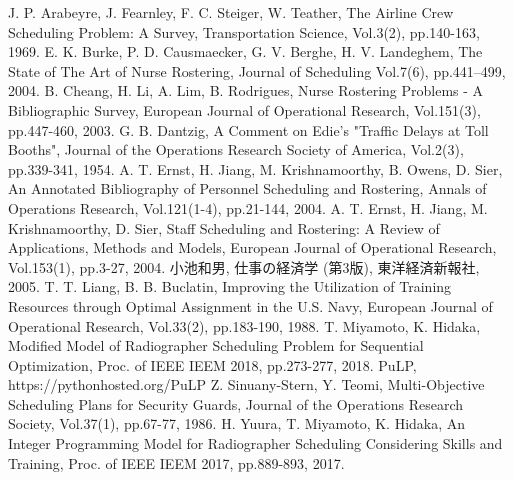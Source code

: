 \documentclass[twocolumn]{jsarticle}
\begin{document}
\begin{thebibliography}{99}
    J. P. Arabeyre, J. Fearnley, F. C. Steiger, W. Teather,
    The Airline Crew Scheduling Problem: A Survey,
    Transportation Science,
	Vol.3(2), pp.140-163, 1969.
    E. K. Burke, P. D. Causmaecker, G. V. Berghe, H. V. Landeghem,
    The State of The Art of Nurse Rostering,
    Journal of Scheduling Vol.7(6), pp.441–499, 2004.
    B. Cheang, H. Li, A. Lim, B. Rodrigues,
    Nurse Rostering Problems - A Bibliographic Survey,
    European Journal of Operational Research,
    Vol.151(3), pp.447-460, 2003.
    G. B. Dantzig, A Comment on Edie's "Traffic Delays at Toll Booths",
    Journal of the Operations Research Society of America,
    Vol.2(3), pp.339-341, 1954.
    A. T. Ernst, H. Jiang, M. Krishnamoorthy, B. Owens, D. Sier,
    An Annotated Bibliography of Personnel Scheduling and Rostering,
    Annals of Operations Research,
    Vol.121(1-4), pp.21-144, 2004.
    A. T. Ernst, H. Jiang, M. Krishnamoorthy, D. Sier,
    Staff Scheduling and Rostering: A Review of Applications, Methods and Models,
    European Journal of Operational Research,
    Vol.153(1), pp.3-27, 2004.
    小池和男, 仕事の経済学 (第3版), 東洋経済新報社, 2005.
    T. T. Liang, B. B. Buclatin, Improving the Utilization of Training Resources through Optimal Assignment in the U.S. Navy,
    European Journal of Operational Research,
    Vol.33(2), pp.183-190, 1988.
  	T. Miyamoto, K. Hidaka,
    Modified Model of Radiographer Scheduling Problem for Sequential Optimization,
    Proc. of IEEE IEEM 2018, pp.273-277, 2018.
  PuLP, https://pythonhosted.org/PuLP
  Z. Sinuany-Stern, Y. Teomi, Multi-Objective Scheduling Plans for Security Guards,
  Journal of the Operations Research Society,
  Vol.37(1), pp.67-77, 1986.
  	H. Yuura, T. Miyamoto, K. Hidaka,
    An Integer Programming Model for Radiographer Scheduling Considering Skills and Training,
    Proc. of IEEE IEEM 2017, pp.889-893, 2017.
\end{thebibliography}
\end{document}
